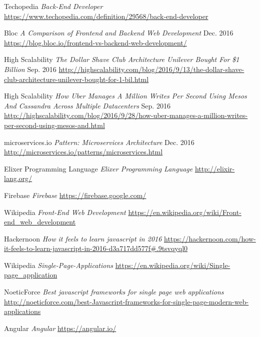 \begin{thebibliography}{9}
	Techopedia
	\emph{Back-End Developer}
	\url{https://www.techopedia.com/definition/29568/back-end-developer}
	
	Bloc
	\emph{A Comparison of Frontend and Backend Web Development}
	Dec. 2016
	\url{https://blog.bloc.io/frontend-vs-backend-web-development/}
	
	High Scalability
	\emph{The Dollar Shave Club Architecture Unilever Bought For \$1 Billion}
	Sep. 2016
	\url{http://highscalability.com/blog/2016/9/13/the-dollar-shave-club-architecture-unilever-bought-for-1-bil.html}
	
		High Scalability
	\emph{How Uber Manages A Million Writes Per Second Using Mesos And Cassandra Across Multiple Datacenters}
	Sep. 2016
	\url{http://highscalability.com/blog/2016/9/28/how-uber-manages-a-million-writes-per-second-using-mesos-and.html}
	
	microservices.io
	\emph{Pattern: Microservices Architecture}
	Dec. 2016
	\url{http://microservices.io/patterns/microservices.html}
	
	Elixer Programming Language
	\emph{Elixer Programming Language}
	\url{http://elixir-lang.org/}
	
	Firebase
	\emph{Firebase}
	\url{https://firebase.google.com/}
	
	Wikipedia
	\emph{Front-End Web Development}
	\url{https://en.wikipedia.org/wiki/Front-end_web_development}
	
	Hackernoon
	\emph{How it feels to learn javascript in 2016}
	\url{https://hackernoon.com/how-it-feels-to-learn-javascript-in-2016-d3a717dd577f#.9tsvqyql0}
	
	Wikipedia
	\emph{Single-Page-Applications}
	\url{https://en.wikipedia.org/wiki/Single-page_application}	
	
	NoeticForce
	\emph{Best javascript frameworks for single page web applications}
	\url{http://noeticforce.com/best-Javascript-frameworks-for-single-page-modern-web-applications}
	
	Angular
	\emph{Angular}
	\url{https://angular.io/}	
	
	
	
\end{thebibliography}